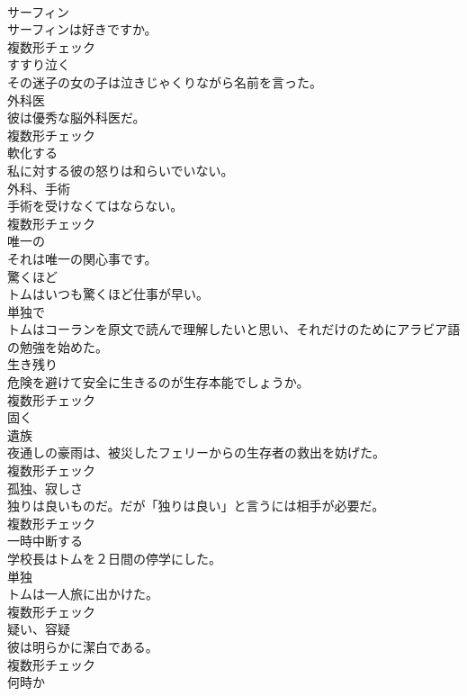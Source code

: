 \documentclass[8pt]{extreport}
\begin{document}
\begin{CJK}{UTF8}{min}
\\	[名詞]	サーフィン	
\\	サーフィンは好きですか。	
\\	複数形チェック
\\	[動詞]	すすり泣く	
\\	その迷子の女の子は泣きじゃくりながら名前を言った。	
\\	[名詞]	外科医	
\\	彼は優秀な脳外科医だ。	
\\	複数形チェック
\\	[動詞]	軟化する	
\\	私に対する彼の怒りは和らいでいない。	
\\	[名詞]	外科、手術	
\\	手術を受けなくてはならない。	
\\	複数形チェック
\\	[形容詞]	唯一の	
\\	それは唯一の関心事です。	
\\	[副詞]	驚くほど	
\\	トムはいつも驚くほど仕事が早い。	
\\	[副詞]	単独で	
\\	トムはコーランを原文で読んで理解したいと思い、それだけのためにアラビア語の勉強を始めた。	
\\	[名詞]	生き残り	
\\	危険を避けて安全に生きるのが生存本能でしょうか。	
\\	複数形チェック
\\	[副詞]	固く	
\\	[名詞]	遺族	
\\	夜通しの豪雨は、被災したフェリーからの生存者の救出を妨げた。	
\\	複数形チェック
\\	[名詞]	孤独、寂しさ	
\\	独りは良いものだ。だが「独りは良い」と言うには相手が必要だ。	
\\	複数形チェック
\\	[動詞]	一時中断する	
\\	学校長はトムを２日間の停学にした。	
\\	[名詞]	単独	
\\	トムは一人旅に出かけた。	
\\	複数形チェック
\\	[名詞]	疑い、容疑	
\\	彼は明らかに潔白である。	
\\	複数形チェック
\\	[副詞]	何時か	

\end{CJK}
\end{document}
